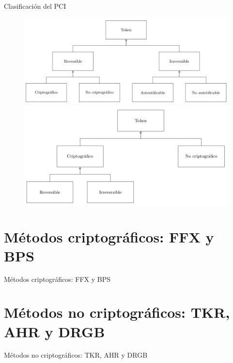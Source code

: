 \documentclass{beamer}
\begin{document}
  \begin{frame}{Clasificación del PCI}
    \begin{figure}[H]
      \begin{center}
        \includegraphics[width=0.8\linewidth]{presentacion_rci/diagramas/clasificacion_pci.png}
\newline
\newline
        \includegraphics[width=0.8\linewidth]{presentacion_rci/diagramas/clasificacion_propia.png}
      \end{center}
    \end{figure}
  \end{frame}

  \section{Métodos criptográficos: FFX y BPS}

  \begin{frame}{Métodos criptográficos: FFX y BPS}
    
  \end{frame}

  \section{Métodos no criptográficos: TKR, AHR y DRGB}

  \begin{frame}{Métodos no criptográficos: TKR, AHR y DRGB}
    
  \end{frame}
\end{document}
